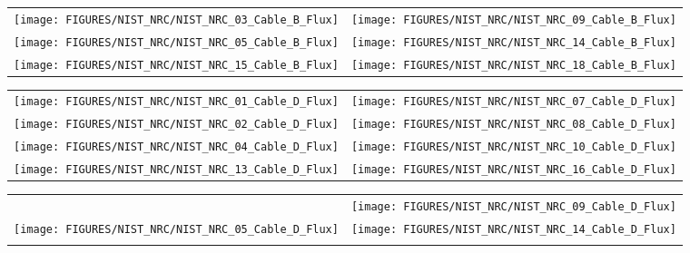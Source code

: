 \begin{figure}[p]
\begin{tabular*}{\textwidth}{l@{\extracolsep{\fill}}r}
\texttt{[image: FIGURES/NIST\_NRC/NIST\_NRC\_03\_Cable\_B\_Flux]} &
\texttt{[image: FIGURES/NIST\_NRC/NIST\_NRC\_09\_Cable\_B\_Flux]} \\
\texttt{[image: FIGURES/NIST\_NRC/NIST\_NRC\_05\_Cable\_B\_Flux]} &
\texttt{[image: FIGURES/NIST\_NRC/NIST\_NRC\_14\_Cable\_B\_Flux]} \\
\texttt{[image: FIGURES/NIST\_NRC/NIST\_NRC\_15\_Cable\_B\_Flux]} &
\texttt{[image: FIGURES/NIST\_NRC/NIST\_NRC\_18\_Cable\_B\_Flux]}
\end{tabular*}
\label{NIST_NRC_Cable_B_Flux_Open}
\end{figure}

\begin{figure}[p]
\begin{tabular*}{\textwidth}{l@{\extracolsep{\fill}}r}
\texttt{[image: FIGURES/NIST\_NRC/NIST\_NRC\_01\_Cable\_D\_Flux]} &
\texttt{[image: FIGURES/NIST\_NRC/NIST\_NRC\_07\_Cable\_D\_Flux]} \\
\texttt{[image: FIGURES/NIST\_NRC/NIST\_NRC\_02\_Cable\_D\_Flux]} &
\texttt{[image: FIGURES/NIST\_NRC/NIST\_NRC\_08\_Cable\_D\_Flux]} \\
\texttt{[image: FIGURES/NIST\_NRC/NIST\_NRC\_04\_Cable\_D\_Flux]} &
\texttt{[image: FIGURES/NIST\_NRC/NIST\_NRC\_10\_Cable\_D\_Flux]} \\
\texttt{[image: FIGURES/NIST\_NRC/NIST\_NRC\_13\_Cable\_D\_Flux]} &
\texttt{[image: FIGURES/NIST\_NRC/NIST\_NRC\_16\_Cable\_D\_Flux]}
\end{tabular*}
\label{NIST_NRC_Cable_D_Flux_Closed}
\end{figure}

\begin{figure}[p]
\begin{tabular*}{\textwidth}{l@{\extracolsep{\fill}}r}
                           &
\texttt{[image: FIGURES/NIST\_NRC/NIST\_NRC\_09\_Cable\_D\_Flux]} \\
\texttt{[image: FIGURES/NIST\_NRC/NIST\_NRC\_05\_Cable\_D\_Flux]} &
\texttt{[image: FIGURES/NIST\_NRC/NIST\_NRC\_14\_Cable\_D\_Flux]} \\
                      &
\end{tabular*}
\label{NIST_NRC_Cable_D_Flux_Open}
\end{figure}

